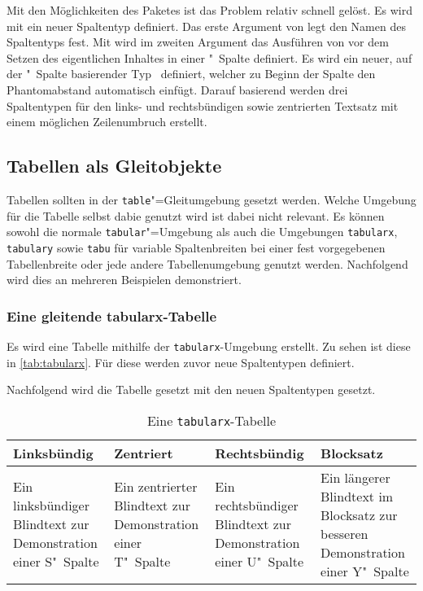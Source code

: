 \documentclass[%
  english,ngerman,%
  cdgeometry=no,DIV=12,automark,%
]{tudscrartcl}
\begin{document}
Mit den Möglichkeiten des Paketes  ist das Problem relativ 
schnell gelöst. Es wird mit  ein neuer Spaltentyp 
definiert. Das erste Argument von  legt den Namen des 
Spaltentyps fest. Mit  wird im 
zweiten Argument das Ausführen von  vor dem Setzen des 
eigentlichen Inhaltes in einer "~Spalte definiert. Es wird ein 
neuer, auf der "~Spalte basierender Typ~ definiert, welcher 
zu Beginn der Spalte den Phantomabstand automatisch einfügt. Darauf basierend 
werden drei Spaltentypen für den links- und rechtsbündigen sowie zentrierten 
Textsatz mit einem möglichen Zeilenumbruch erstellt.
%
\begin{Trunk+}
\subsection{Tabellen als Gleitobjekte}
Tabellen sollten in der \texttt{table}"=Gleitumgebung gesetzt werden. 
Welche Umgebung für die Tabelle selbst dabie genutzt wird ist dabei
nicht relevant. Es können sowohl die normale \texttt{tabular}"=Umgebung 
als auch die Umgebungen \texttt{tabularx}, \texttt{tabulary} sowie 
\texttt{tabu} für variable Spaltenbreiten bei einer fest vorgegebenen 
Tabellenbreite oder jede andere Tabellenumgebung genutzt werden. 
Nachfolgend wird dies an mehreren Beispielen demonstriert.

\subsubsection{Eine gleitende tabularx-Tabelle}
Es wird eine Tabelle mithilfe der \texttt{tabularx}-Umgebung erstellt. 
Zu sehen ist diese in \autoref{tab:tabularx}. Für diese werden zuvor 
neue Spaltentypen definiert.

\end{Trunk+}
\CodeHook{\renewcommand*{\newcolumntype}[2]{}}
\begin{Trunk*}

\end{Trunk*}
%
Nachfolgend wird die Tabelle gesetzt mit den neuen Spaltentypen gesetzt.
%
\begin{Trunk}
\begin{table}
\begin{tabularx}{\textwidth}{@{}DEFY@{}}
\toprule
\textbf{Linksbündig} & \textbf{Zentriert} & 
\textbf{Rechtsbündig} & \textbf{Blocksatz} \tabularnewline
\midrule
Ein linksbündiger Blindtext zur Demonstration einer S"~Spalte &
Ein zentrierter Blindtext zur Demonstration einer T"~Spalte &
Ein rechtsbündiger Blindtext zur Demonstration einer U"~Spalte &
Ein längerer Blindtext im Blocksatz zur besseren Demonstration
einer Y"~Spalte\tabularnewline
\bottomrule
\end{tabularx}
\caption{Eine \texttt{tabularx}-Tabelle}\label{tab:tabularx}
\end{table}

\end{Trunk}
\end{document}
